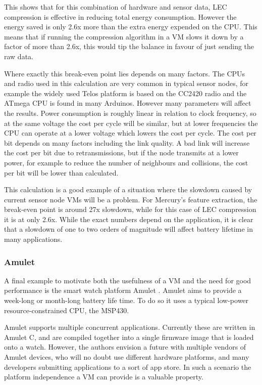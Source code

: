This shows that for this combination of hardware and sensor data, LEC compression is effective in reducing total energy consumption. However the energy saved is only 2.6x more than the extra energy expended on the CPU. This means that if running the compression algorithm in a VM slows it down by a factor of more than 2.6x, this would tip the balance in favour of just sending the raw data.

Where exactly this break-even point lies depends on many factors. The CPUs and radio used in this calculation are very common in typical sensor nodes, for example the widely used Telos platform \cite{Polastre:2005ut} is based on the CC2420 radio and the ATmega CPU is found in many Arduinos. However many parameters will affect the results. Power consumption is roughly linear in relation to clock frequency, so at the same voltage the cost per cycle will be similar, but at lower frequencies the CPU can operate at a lower voltage which lowers the cost per cycle. The cost per bit depends on many factors including the link quality. A bad link will increase the cost per bit due to retransmissions, but if the node transmits at a lower power, for example to reduce the number of neighbours and collisions, the cost per bit will be lower than calculated.

This calculation is a good example of a situation where the slowdown caused by current sensor node VMs will be a problem. For Mercury's feature extraction, the break-even point is around 27x slowdown, while for this case of LEC compression it is at only 2.6x. While the exact numbers depend on the application, it is clear that a slowdown of one to two orders of magnitude will affect battery lifetime in many applications.

\subsubsection{Amulet}
A final example to motivate both the usefulness of a VM and the need for good performance is the smart watch platform Amulet \cite{Hester:2016je}. Amulet aims to provide a week-long or month-long battery life time. To do so it uses a typical low-power resource-constrained CPU, the MSP430.

Amulet supports multiple concurrent applications. Currently these are written in Amulet C, and are compiled together into a single firmware image that is loaded onto a watch. However, the authors envision a future with multiple vendors of Amulet devices, who will no doubt use different hardware platforms, and many developers submitting applications to a sort of app store. In such a scenario the platform independence a VM can provide is a valuable property.

